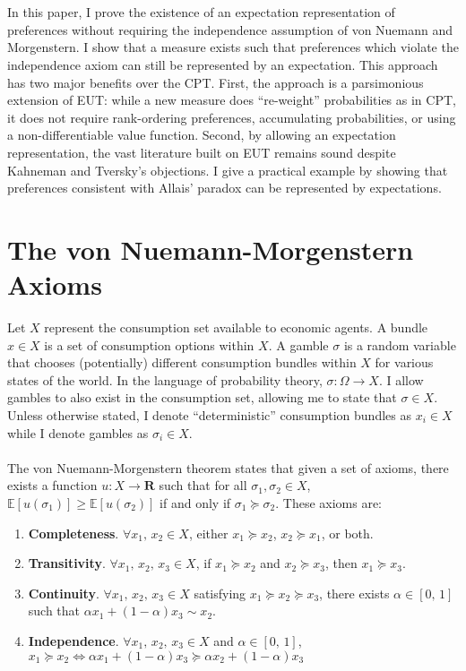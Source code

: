 \documentclass{article}
\begin{document}
\\
\\
In this paper, I prove the existence of an expectation representation of preferences without requiring the independence assumption of von Nuemann and Morgenstern.  I show that a measure exists such that preferences which violate the independence axiom can still be represented by an expectation.  This approach has two major benefits over the CPT.  First, the approach is a parsimonious extension of EUT: while a new measure does ``re-weight'' probabilities as in CPT, it does not require rank-ordering preferences, accumulating probabilities, or using a non-differentiable value function.  Second, by allowing an expectation representation, the vast literature built on EUT remains sound despite Kahneman and Tversky's objections. I give a practical example by showing that preferences consistent with Allais' paradox can be represented by expectations.  

\section{The von Nuemann-Morgenstern Axioms}

Let \(X\) represent the consumption set available to economic agents.  A bundle \(x \in X\) is a set of consumption options within \(X\).  A gamble \(\sigma\) is a random variable that chooses (potentially) different consumption bundles within \(X\) for various states of the world.  In the language of probability theory, \(\sigma: \Omega \to X\).  I allow gambles to also exist in the consumption set, allowing me to state that \(\sigma \in X\).  Unless otherwise stated, I denote ``deterministic'' consumption bundles as \(x_i \in X\) while I denote gambles as \(\sigma_i \in X\). 
\\
\\
The von Nuemann-Morgenstern theorem states that given a set of axioms, there exists a function \(u: X \to \mathbf{R}\) such that for all \(\sigma_1, \sigma_2 \in X\), \(\mathbb{E}\left[u(\sigma_1)\right] \geq \mathbb{E}\left[u(\sigma_2)\right]\) if and only if \(\sigma_1 \succeq  \sigma_2\).  These axioms are:

\begin{enumerate}
	\item \textbf{Completeness}.  \(\forall x_1, \, x_2 \in X\), either \(x_1 \succeq  x_2\), \(x_2 \succeq  x_1\), or both.
	\item \textbf{Transitivity}.  \(\forall x_1, \, x_2,\, x_3 \in X\), if \(x_1 \succeq  x_2\) and \(x_2 \succeq  x_3\), then \(x_1 \succeq  x_3\).
	\item \textbf{Continuity}.  \(\forall x_1, \, x_2,\,x_3 \in X\) satisfying \(x_1 \succeq  x_2 \succeq  x_3\), there exists \(\alpha \in [0,\,1]\) such that \(\alpha x_1+(1-\alpha) x_3 \sim x_2\).
	\item \textbf{Independence}.  \(\forall x_1, \, x_2,\,x_3 \in X\) and \(\alpha \in [0,\,1]\), \(x_1 \succeq  x_2 \Leftrightarrow \alpha x_1+(1-\alpha)x_3 \succeq  \alpha x_2 +(1-\alpha)x_3\)
\end{enumerate}
\end{document}
